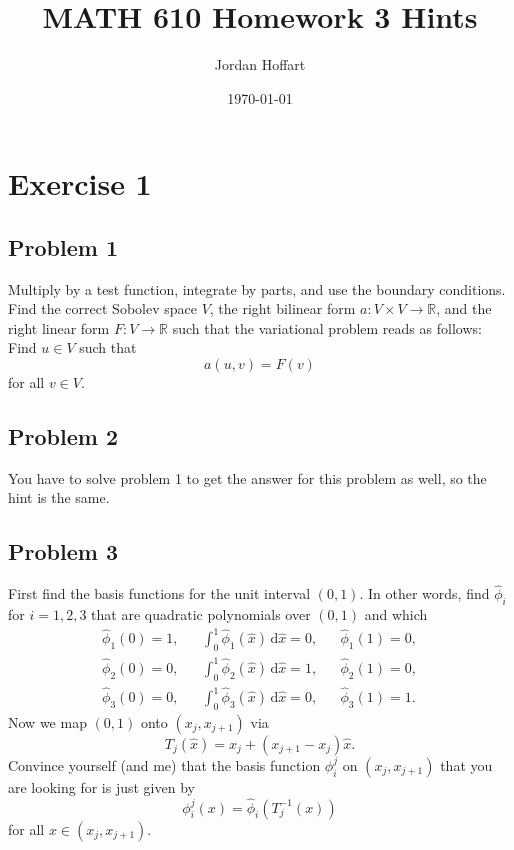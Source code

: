 \documentclass{article}
\title{MATH 610 Homework 3 Hints}
\author{Jordan Hoffart}
\date{\today}
\theoremstyle{definition}
\theoremstyle{plain}
\theoremstyle{remark}
\renewcommand{\d}{\mathrm d}
\begin{document}
\maketitle

\section{Exercise 1}

\subsection{Problem 1}
Multiply by a test function, integrate by parts, and use the boundary conditions.
Find the correct Sobolev space $V$, the right bilinear form $a : V \times V \to \mathbb R$, and the right linear form $F:V\to\mathbb R$ such that the variational problem reads as follows: Find $u \in V$ such that \[a(u,v) = F(v)\] for all $v\in V$.

\subsection{Problem 2}
You have to solve problem 1 to get the answer for this problem as well, so the hint is the same.

\subsection{Problem 3}
First find the basis functions for the unit interval $(0,1)$. 
In other words, find $\widehat \phi_i$ for $i = 1,2,3$ that are quadratic polynomials over $(0,1)$ and which 
\begin{align}
  \widehat\phi_1(0) = 1, && \int_0^1\widehat \phi_1(\widehat x)\,\d\widehat x = 0, && \widehat\phi_1(1) = 0, \\
  \widehat\phi_2(0) = 0, && \int_0^1\widehat \phi_2(\widehat x)\,\d\widehat x = 1, && \widehat\phi_2(1) = 0, \\
  \widehat\phi_3(0) = 0, && \int_0^1\widehat \phi_3(\widehat x)\,\d\widehat x = 0, && \widehat\phi_3(1) = 1.
\end{align}
Now we map $(0,1)$ onto $(x_j,x_{j+1})$ via 
\begin{equation}\label{eq:change_coordinates}
T_j(\widehat x) = x_j + (x_{j+1} - x_j)\widehat x.
\end{equation}
Convince yourself (and me) that the basis function $\phi_i^j$ on $(x_j,x_{j+1})$ that you are looking for is just given by \[\phi_i^j(x) = \widehat \phi_i(T_j^{-1}(x))\] for all $x \in (x_j,x_{j+1})$.
\end{document}
